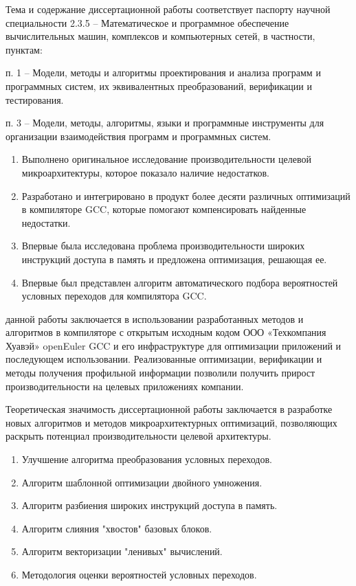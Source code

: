 Тема и содержание диссертационной работы соответствует паспорту научной
специальности 2.3.5 – Математическое и программное обеспечение вычислительных машин, комплексов и компьютерных сетей, в частности, пунктам:

п. 1 – Модели, методы и алгоритмы проектирования и анализа программ
и программных систем, их эквивалентных преобразований, верификации и тестирования.

п. 3 – Модели, методы, алгоритмы, языки и программные инструменты
для организации взаимодействия программ и программных систем.

{\novelty}
\begin{enumerate}[beginpenalty=10000] %
  \item Выполнено оригинальное исследование производительности целевой микроархитектуры, которое показало наличие недостатков.
  \item Разработано и интегрировано в продукт более десяти различных оптимизаций в компиляторе GCC, которые помогают компенсировать найденные недостатки.
  \item Впервые была исследована проблема производительности широких инструкций доступа в память и предложена оптимизация, решающая ее. 
  \item Впервые был представлен алгоритм автоматического подбора вероятностей условных переходов для компилятора GCC.
\end{enumerate}

{\influence}  данной работы заключается в использовании
разработанных методов и алгоритмов в  компиляторе с открытым исходным кодом  ООО «Техкомпания Хуавэй»  openEuler GCC и его
инфраструктуре для оптимизации приложений и последующем использовании. Реализованные оптимизации, верификации
и методы получения профильной информации позволили получить прирост производительности
на целевых приложениях компании.

Теоретическая значимость диссертационной работы заключается в разработке
новых алгоритмов и методов микроархитектурных оптимизаций, позволяющих раскрыть потенциал производительности целевой архитектуры.


{}
\begin{enumerate}[beginpenalty=10000] %
  \item Улучшение алгоритма преобразования условных переходов.
  \item Алгоритм шаблонной оптимизации двойного умножения.
  \item Алгоритм разбиения широких инструкций доступа в память.
  \item Алгоритм слияния "хвостов"\phantom{ } базовых блоков.
  \item Алгоритм векторизации "ленивых"\phantom{ } вычислений.
  \item Методология оценки вероятностей условных переходов.
\end{enumerate}

